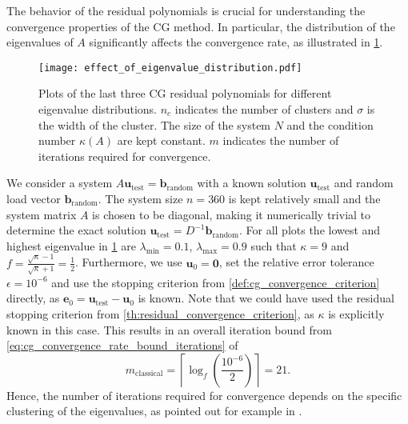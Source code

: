 The behavior of the residual polynomials is crucial for understanding the convergence properties of the CG method. In particular, the distribution of the eigenvalues of $A$ significantly affects the convergence rate, as illustrated in \cref{fig:cg_effect_of_eigenvalue_distribution}.
\begin{figure}[H]
  \centering
  \texttt{[image: effect\_of\_eigenvalue\_distribution.pdf]}
  \caption{Plots of the last three CG residual polynomials for different eigenvalue distributions. $n_c$ indicates the number of clusters and $\sigma$ is the width of the cluster. The size of the system $N$ and the condition number $\kappa(A)$ are kept constant. $m$ indicates the number of iterations required for convergence.}
  \label{fig:cg_effect_of_eigenvalue_distribution}
\end{figure}
We consider a system $A\mathbf{u}_{\text{test}} = \mathbf{b}_{\text{random}}$ with a known solution $\mathbf{u}_{\text{test}}$ and random load vector $\mathbf{b}_{\text{random}}$. The system size $n=360$ is kept relatively small and the system matrix $A$ is chosen to be diagonal, making it numerically trivial to determine the exact solution $\mathbf{u}_{\text{test}} = D^{-1}\mathbf{b}_{\text{random}}$. For all plots the lowest and highest eigenvalue in \cref{fig:cg_effect_of_eigenvalue_distribution} are $\lambda_{\text{min}} = 0.1$, $\lambda_{\text{max}} = 0.9$ such that $\kappa = 9$ and $f = \frac{\sqrt{\kappa} - 1}{\sqrt{\kappa} + 1} = \frac{1}{2}$. Furthermore, we use $\mathbf{u}_{0} = \mathbf{0}$, set the relative error tolerance $\epsilon = 10^{-6}$ and use the stopping criterion from \cref{def:cg_convergence_criterion} directly, as $\mathbf{e}_0 = \mathbf{u}_{\text{test}} - \mathbf{u}_{0}$ is known. Note that we could have used the residual stopping criterion from \cref{th:residual_convergence_criterion}, as $\kappa$ is explicitly known in this case. This results in an overall iteration bound from \cref{eq:cg_convergence_rate_bound_iterations} of
\[
  m_{\text{classical}} = \left\lceil\log_f\left(\frac{10^{-6}}{2}\right)\right\rceil = 21.
\]
Hence, the number of iterations required for convergence depends on the specific clustering of the eigenvalues, as pointed out for example in \cite[Section 2.3]{nonlinear_cg_Kelley_1995}.

